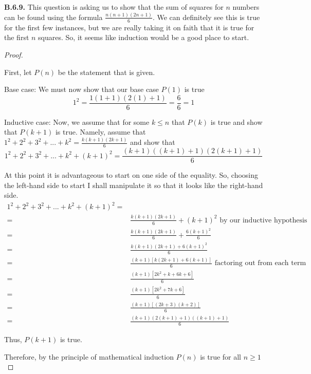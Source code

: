 \documentclass[10pt,]{book}
\theoremstyle{plain}
\theoremstyle{definition}
\theoremstyle{definition}
\theoremstyle{definition}
\theoremstyle{definition}
\numberwithin{equation}{chapter}
\newcommand{\amp}{&}
\begin{document}
\par\smallskip
\noindent\textbf{B.6.9.} \hypertarget{p-2184}{}%
This question is asking us to show that the sum of squares for \(n\) numbers can be found using the formula \(\frac{n(n+1)(2n+1)}{6}\). We can definitely see this is true for the first few instances, but we are really taking it on faith that it is true for the first \(n\) squares. So, it seems like induction would be a good place to start.%
\begin{proof}\hypertarget{proof-48}{}
\hypertarget{p-2185}{}%
First, let \(P(n)\) be the statement that is given.%
\par
\hypertarget{p-2186}{}%
Base case: We must now show that our base case \(P(1)\) is true%
\begin{equation*}
1^2 = \frac{1(1+1)(2(1)+1)}{6} = \frac{6}{6} =1
\end{equation*}
%
\par
\hypertarget{p-2187}{}%
Inductive case: Now, we assume that for some \(k\leq n\) that \(P(k)\) is true and show that \(P(k+1)\) is true. Namely, assume that \(1^2 +2^2 +3^2+...+k^2 = \frac{k(k+1)(2k+1)}{6}\) and show that%
\begin{equation*}
1^2 +2^2 +3^2+...+k^2+{(k+1)}^2 = \frac{(k+1)((k+1)+1)(2(k+1)+1)}{6}
\end{equation*}
%
\par
\hypertarget{p-2188}{}%
At this point it is advantageous to start on one side of the equality. So, choosing the left-hand side to start I shall manipulate it so that it looks like the right-hand side.%
\begin{align*}
1^2 +2^2 +3^2+...+k^2+{(k+1)}^2 =\\
= \amp \frac{k(k+1)(2k+1)}{6} +(k+1)^2 \mbox{ by our inductive hypothesis}\\
= \amp \frac{k(k+1)(2k+1)}{6} +\frac{6(k+1)^2}{6}\\
= \amp \frac{k(k+1)(2k+1)+6(k+1)^2}{6}\\
= \amp \frac{(k+1)[k(2k+1)+6(k+1)]}{6} \mbox{ factoring out  from each term}\\
= \amp \frac{(k+1)[2k^2+k+6k+6]}{6}\\
= \amp \frac{(k+1)[2k^2+7k+6]}{6}\\
= \amp \frac{(k+1)[(2k+3)(k+2)]}{6}\\
= \amp \frac{(k+1)(2(k+1)+1)((k+1)+1)}{6}
\end{align*}
%
\par
\hypertarget{p-2189}{}%
Thus, \(P(k+1)\) is true.%
\par
\hypertarget{p-2190}{}%
Therefore, by the principle of mathematical induction \(P(n)\) is true for all \(n \geq 1\)%
\end{proof}
\end{document}
